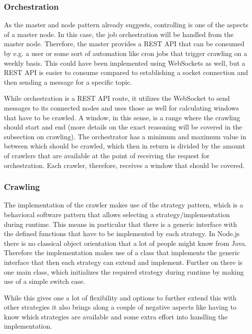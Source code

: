 \subsubsection{Orchestration}
As the master and node pattern already suggests, controlling is one of the aspects of a master node. In this case, the job orchestration will be handled from the master node. Therefore, the master provides a REST API that can be consumed by e.g. a user or some sort of automation like cron jobs that trigger crawling on a weekly basis. This could have been implemented using WebSockets as well, but a REST API is easier to consume compared to establishing a socket connection and then sending a message for a specific topic.

While orchestration is a REST API route, it utilizes the WebSocket to send messages to its connected nodes and uses those as well for calculating windows that have to be crawled. A window, in this sense, is a range where the crawling should start and end (more details on the exact reasoning will be covered in the subsection on crawling). The orchestrator has a minimum and maximum value in between which should be crawled, which then in return is divided by the amount of crawlers that are available at the point of receiving the request for orchestration. Each crawler, therefore, receives a window that should be covered.

\subsubsection{Crawling}
The implementation of the crawler makes use of the strategy pattern, which is a behavioral software pattern that allows selecting a strategy/implementation during runtime. This means in particular that there is a generic interface with the defined functions that have to be implemented by each strategy. In Node.js there is no classical object orientation that a lot of people might know from Java. Therefore the implementation makes use of a class that implements the generic interface that then each strategy can extend and implement. Further on there is one main class, which initializes the required strategy during runtime by making use of a simple switch case.

While this gives one a lot of flexibility and options to further extend this with other strategies it also brings along a couple of negative aspects like having to know which strategies are available and some extra effort into handling the implementation.

